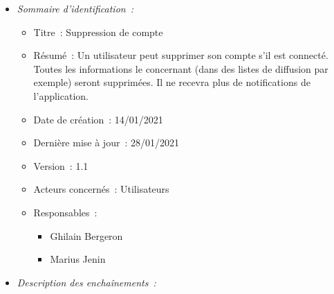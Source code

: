 \begin{itemize}

\item \textit{Sommaire d'identification~:}

    \begin{itemize}
    
    \item Titre~: Suppression de compte
    
    \item Résumé~: Un utilisateur peut supprimer son compte s'il est connecté. 
    Toutes les informations le concernant (dans des listes de diffusion par exemple) seront supprimées.
    Il ne recevra plus de notifications de l'application.
    
    \item Date de création~: 14/01/2021
    
    \item Dernière mise à jour~: 28/01/2021
    
    \item Version~: 1.1
    
    \item Acteurs concernés~: Utilisateurs
    
    \item Responsables~:
    
        \begin{itemize}
            \item Ghilain Bergeron
            \item Marius Jenin
        \end{itemize}
    
    \end{itemize}

\item \textit{Description des enchaînements~:}


\end{itemize}
